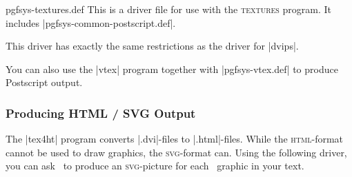 \begin{filedescription}{pgfsys-textures.def}
  This is a driver file for use with the \textsc{textures} program. It
  includes |pgfsys-common-postscript.def|. 

  This driver has exactly the same restrictions as the driver for
  |dvips|. 
\end{filedescription}

You can also use the |vtex| program together with |pgfsys-vtex.def| to
produce Postscript output.



\subsubsection{Producing HTML / SVG Output}

The |tex4ht| program converts |.dvi|-files to |.html|-files. While the
\textsc{html}-format cannot be used to draw graphics, the
\textsc{svg}-format can. Using the following driver, you can ask
\pgfname\ to produce an \textsc{svg}-picture for each \pgfname\
graphic in your text.

